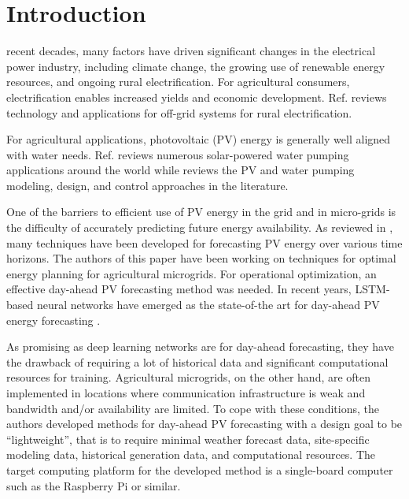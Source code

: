 \section{Introduction}
\label{sec:intro}

 recent decades, many factors have driven significant changes in the electrical power industry,
including climate change,
the growing use of renewable energy resources,
and ongoing rural electrification.
For agricultural consumers, electrification enables increased yields and economic development.
Ref. \cite{Mandelli2016} reviews technology and applications for off-grid systems for rural electrification.

For agricultural applications, photovoltaic (PV) energy is generally well aligned with water needs\cite{Aliyu2018}.
Ref. \cite{Aliyu2018} reviews numerous solar-powered water pumping applications around the world while \cite{Muhsen2017} reviews the PV and water pumping modeling, design, and control approaches in the literature.

One of the barriers to efficient use of PV energy in the grid and in micro-grids
is the difficulty of accurately predicting future energy availability.
As reviewed in \cite{Antonanzas2016}, many techniques have been developed for forecasting PV energy over various time horizons.
The authors of this paper have been working on techniques for optimal energy planning for agricultural microgrids.
For operational optimization, an effective day-ahead PV forecasting method was needed.
In recent years, LSTM-based neural networks have emerged as the state-of-the art
for day-ahead PV energy forecasting
\cite{Kuo2022,Aslam2021,Liu2021}.

As promising as deep learning networks are for day-ahead forecasting,
they have the drawback of requiring 
a lot of historical data\cite{Aillaud2020} and significant computational resources for training.
Agricultural microgrids, on the other hand, are often implemented in locations where communication infrastructure is weak
and bandwidth and/or availability are limited.
To cope with these conditions, the authors developed methods for day-ahead PV forecasting with a design goal to be ``lightweight'', that is to require minimal weather forecast data, site-specific modeling data, historical generation data, and computational resources.
The target computing platform for the developed method is a single-board computer such as the Raspberry Pi or similar.
